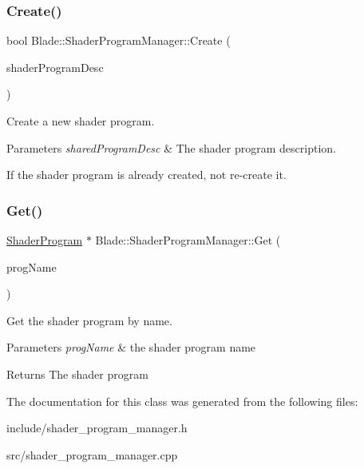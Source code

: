 \subsubsection{\texorpdfstring{Create()}{Create()}}
{\footnotesize\ttfamily bool Blade\+::\+Shader\+Program\+Manager\+::\+Create (\begin{DoxyParamCaption}\item[{const \hyperlink{struct_blade_1_1_shader_program_desc}{Shader\+Program\+Desc} \&}]{shader\+Program\+Desc }\end{DoxyParamCaption})\hspace{0.3cm}{\ttfamily [noexcept]}}



Create a new shader program. 


\begin{DoxyParams}{Parameters}
{\em shared\+Program\+Desc} & The shader program description.\\
\hline
\end{DoxyParams}
If the shader program is already created, not re-\/create it. \mbox{\label{class_blade_1_1_shader_program_manager_a5e9744ef91a953b1ca5cc38160568804}} 
\subsubsection{\texorpdfstring{Get()}{Get()}}
{\footnotesize\ttfamily \hyperlink{class_blade_1_1_shader_program}{Shader\+Program} $\ast$ Blade\+::\+Shader\+Program\+Manager\+::\+Get (\begin{DoxyParamCaption}\item[{const std\+::string \&}]{prog\+Name }\end{DoxyParamCaption})\hspace{0.3cm}{\ttfamily [noexcept]}}



Get the shader program by name. 


\begin{DoxyParams}{Parameters}
{\em prog\+Name} & the shader program name \\
\hline
\end{DoxyParams}
\begin{DoxyReturn}{Returns}
The shader program 
\end{DoxyReturn}


The documentation for this class was generated from the following files\+:\begin{DoxyCompactItemize}
\item 
include/shader\+\_\+program\+\_\+manager.\+h\item 
src/shader\+\_\+program\+\_\+manager.\+cpp\end{DoxyCompactItemize}
